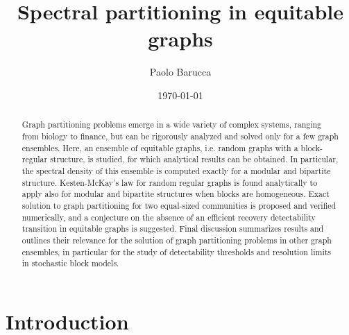 \documentclass[%
 reprint,
 amsmath,amssymb,
 aps,
 pre,
 showpacs
]{revtex4-1}
\begin{document}
\title{Spectral partitioning in equitable graphs}
\author{Paolo Barucca}

\date{\today} 

\begin{abstract}
Graph partitioning problems emerge in a wide variety of complex systems, ranging from biology to finance, but can be rigorously analyzed and solved only for a few graph ensembles. Here, an ensemble of equitable graphs, i.e. random graphs with a block-regular structure, is studied, for which analytical results can be obtained.
In particular, the spectral density of this ensemble is computed exactly for a modular and bipartite structure. Kesten-McKay's law for random regular graphs is found analytically to apply also for modular and bipartite structures when blocks are homogeneous. Exact solution to graph partitioning for two equal-sized communities is proposed and verified numerically, and a conjecture on the absence of an efficient recovery detectability transition in equitable graphs is suggested. 
Final discussion summarizes results and outlines their relevance for the solution of graph partitioning problems in other graph ensembles, in particular for the study of detectability thresholds and resolution limits in stochastic block models.
\end{abstract}

\maketitle

\section{\label{sec:intro}Introduction}
\end{document}
